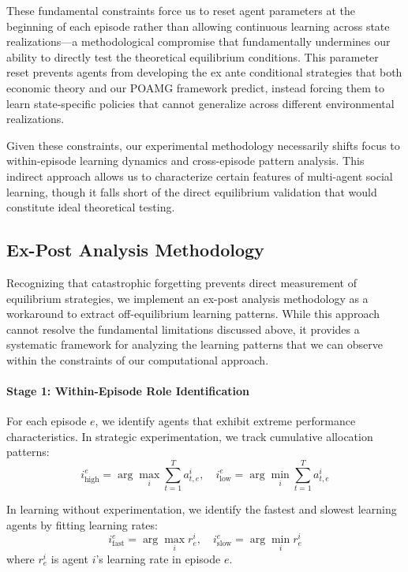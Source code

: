 These fundamental constraints force us to reset agent parameters at the beginning of each episode rather than allowing continuous learning across state realizations—a methodological compromise that fundamentally undermines our ability to directly test the theoretical equilibrium conditions. This parameter reset prevents agents from developing the ex ante conditional strategies that both economic theory and our POAMG framework predict, instead forcing them to learn state-specific policies that cannot generalize across different environmental realizations.

Given these constraints, our experimental methodology necessarily shifts focus to within-episode learning dynamics and cross-episode pattern analysis. This indirect approach allows us to characterize certain features of multi-agent social learning, though it falls short of the direct equilibrium validation that would constitute ideal theoretical testing.

\subsection{Ex-Post Analysis Methodology}
\label{sec:ex-post-analysis}

Recognizing that catastrophic forgetting prevents direct measurement of equilibrium strategies, we implement an ex-post analysis methodology as a workaround to extract off-equilibrium learning patterns. While this approach cannot resolve the fundamental limitations discussed above, it provides a systematic framework for analyzing the learning patterns that we can observe within the constraints of our computational approach.

\paragraph{Stage 1: Within-Episode Role Identification} For each episode $e$, we identify agents that exhibit extreme performance characteristics. In strategic experimentation, we track cumulative allocation patterns:
\begin{equation}
    i_{\text{high}}^e = \arg\max_i \sum_{t=1}^T a_{t,e}^i, \quad 
    i_{\text{low}}^e = \arg\min_i \sum_{t=1}^T a_{t,e}^i
\end{equation}

In learning without experimentation, we identify the fastest and slowest learning agents by fitting learning rates:
\begin{equation}
    i_{\text{fast}}^e = \arg\max_i r_e^i, \quad 
    i_{\text{slow}}^e = \arg\min_i r_e^i
\end{equation}
where $r_e^i$ is agent $i$'s learning rate in episode $e$.

